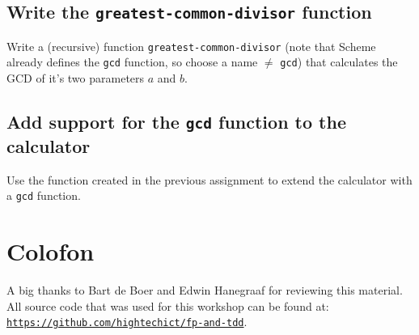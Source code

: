 \documentclass[12pt,a4paper,english,twoside]{article}
\begin{document}
\subsection{Write the \texttt{greatest-common-divisor} function}
Write a (recursive) function \texttt{greatest-common-divisor} (note that 
Scheme already defines the \texttt{gcd} function, so choose a name $\neq$ \texttt{gcd}) 
that calculates the GCD of it's two parameters $a$ and $b$. 
\subsection{Add support for the \texttt{gcd} function to the calculator}
Use the function created in the previous assignment to extend the calculator 
with a \texttt{gcd} function.
\section{Colofon}
A big thanks to Bart de Boer and Edwin Hanegraaf for reviewing this material. 
All source code that was used for this workshop can be found at:\\ 
\texttt{\href{https://github.com/hightechict/fp-and-tdd}{https://github.com/hightechict/fp-and-tdd}}.

\end{document}
